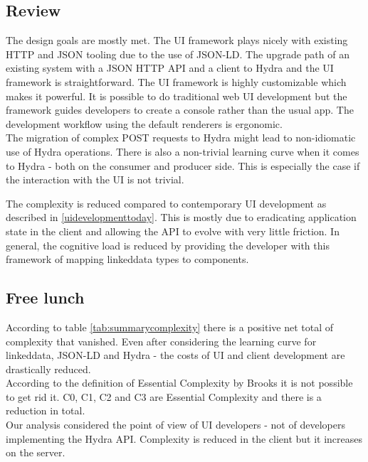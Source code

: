 \subsection{Review}
The design goals are mostly met. The UI framework plays nicely with existing HTTP and JSON tooling due to the use of JSON-LD. The upgrade path of an existing system with a JSON HTTP API and a client to Hydra and the UI framework is straightforward. The UI framework is highly customizable which makes it powerful. It is possible to do traditional web UI development but the framework guides developers to create a console rather than the usual app. The development workflow using the default renderers is ergonomic. \\
The migration of complex POST requests to Hydra might lead to non-idiomatic use of Hydra operations. There is also a non-trivial learning curve when it comes to Hydra - both on the consumer and producer side. This is especially the case if the interaction with the UI is not trivial.

The complexity is reduced compared to contemporary UI development as described in \ref{uidevelopmenttoday}. This is mostly due to eradicating application state in the client and allowing the API to evolve with very little friction. In general, the cognitive load is reduced by providing the developer with this framework of mapping \gls{linkeddata} types to components.

\subsection{Free lunch}
According to table \ref{tab:summarycomplexity} there is a positive net total of complexity that vanished. Even after considering the learning curve for \gls{linkeddata}, JSON-LD and Hydra - the costs of UI and client development are drastically reduced. \\
According to the definition of Essential Complexity by Brooks it is not possible to get rid it. C0, C1, C2 and C3 are Essential Complexity and there is a reduction in total. \\
Our analysis considered the point of view of UI developers - not of developers implementing the Hydra API. Complexity is reduced in the client but it increases on the server.

